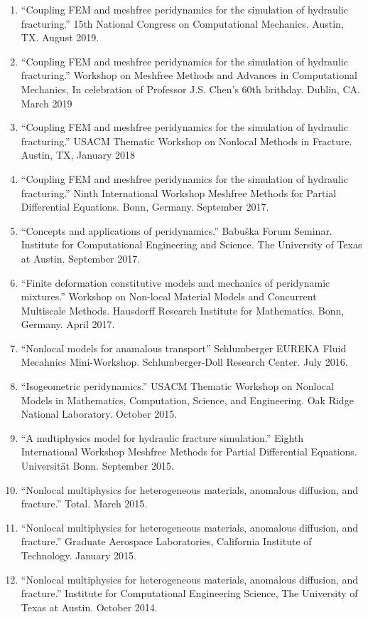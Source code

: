 \begin{etaremune}
\begin{enumerate}
    \item ``Coupling FEM and meshfree peridynamics for the simulation of hydraulic fracturing.'' 15th National Congress on Computational Mechanics. Austin, TX. August 2019.
    \item ``Coupling FEM and meshfree peridynamics for the simulation of hydraulic fracturing.'' Workshop on Meshfree Methods and Advances in Computational Mechanics, In celebration of Professor J.S. Chen's 60th brithday.  Dublin, CA.  March 2019
    \item ``Coupling FEM and meshfree peridynamics for the simulation of hydraulic fracturing.'' USACM Thematic Workshop on Nonlocal Methods in Fracture.  Austin, TX, January 2018
    \item ``Coupling FEM and meshfree peridynamics for the simulation of hydraulic fracturing.'' Ninth International Workshop Meshfree Methods for Partial Differential Equations. Bonn, Germany. September 2017.
    \item ``Concepts and applications of peridynamics.'' Babu\v{s}ka Forum Seminar. Institute for Computational Engineering and Science. The University of Texas at Austin. September 2017.
    \item ``Finite deformation constitutive models and mechanics of peridynamic mixtures.'' Workshop on Non-local Material Models and Concurrent Multiscale Methods. Hausdorff Research Institute for Mathematics.  Bonn, Germany.  April 2017.
    \item ``Nonlocal models for anamalous transport'' Schlumberger EUREKA Fluid Mecahnics Mini-Workshop. Schlumberger-Doll Research Center. July 2016.
    \item ``Isogeometric peridynamics.'' USACM Thematic Workshop on Nonlocal Models in Mathematics, Computation, Science, and Engineering.  Oak Ridge National Laboratory. October 2015.
    \item ``A multiphysics model for hydraulic fracture simulation.''  Eighth International Workshop Meshfree Methods for Partial Differential Equations. Universit\"{a}t Bonn. September 2015.
    \item ``Nonlocal multiphysics for heterogeneous materials, anomalous diffusion, and fracture.'' Total. March 2015.
    \item ``Nonlocal multiphysics for heterogeneous materials, anomalous diffusion, and fracture.'' Graduate Aerospace Laboratories, California Institute of Technology. January 2015.
    \item ``Nonlocal multiphysics for heterogeneous materials, anomalous diffusion, and fracture.'' Institute for Computational Engineering Science, The University of Texas at Austin. October 2014.

\end{enumerate}
\end{etaremune}
